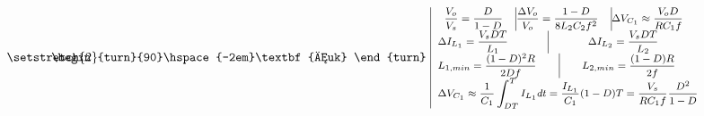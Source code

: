 \documentclass[twocolumn]{article}
\begin{document}
\vspace*{0.5em}
\begin{equation}
{\setstretch{2}
\hspace{-1.48cm}
\begin{array}{r|c}
{\begin{turn}{90}\hspace{-2em}\textbf{Ćuk} \end{turn}} \hspace{-0.05cm} & \hspace{-0.15cm}
{\begin{array}{l}
\begin{array}{c  c  c}
\textrm{\footnotesize $\displaystyle  \frac{V_o}{V_s} = \frac{D}{1-D}$}\hfill &\vline \hfill \textrm{\footnotesize $\displaystyle  \frac{\Delta V_o}{V_o} = \frac{1-D}{8L_2C_2f^2} $} \hfill&\vline\hfill \textrm{\footnotesize $ \displaystyle    \Delta V_{C_1} \approx \frac{V_o D}{R C_1 f}$}\nonumber \hfill \\
\end{array}\\
\textrm{\footnotesize $\displaystyle \hfill\Delta I_{L_1} = \frac{V_sDT}{L_1}$} \hfill \vline \hfill\textrm{\footnotesize $\displaystyle \Delta I_{L_2} = \frac{V_sDT}{L_2}$}\hfill\\
\textrm{\footnotesize $\displaystyle \hfill L_{1,min} = \frac{(1-D)^2R}{2Df}$} \hfill \vline \hfill\textrm{\footnotesize $\displaystyle L_{2,min} = \frac{(1-D)R}{2f}$}\hfill\\
\textrm{\footnotesize $\displaystyle \hfill \Delta V_{C_1} \approx \frac{1}{C_1} \int_{DT}^{T} I_{L_1} dt = \frac{I_{L_1}}{C_1}(1-D)T = \frac{V_s}{RC_1f}\frac{D^2}{1-D}$}\hfill\\
\end{array}}
\end{array}}
\end{equation}
\end{document}
